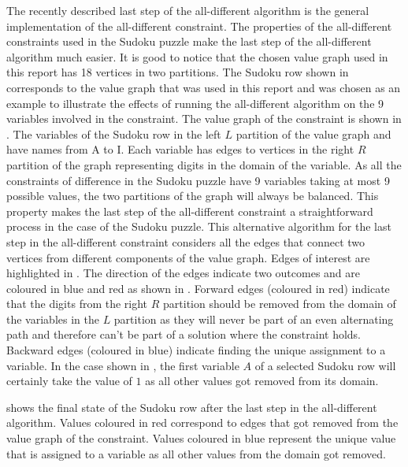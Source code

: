 \documentclass{l4proj}
\begin{document}
\noindent The recently described last step of the all-different algorithm is the general implementation of the all-different constraint. The properties of the all-different constraints used in the Sudoku puzzle make the last step of the all-different algorithm much easier. It is good to notice that the chosen value graph used in this report has 18 vertices in two partitions. The Sudoku row shown in  corresponds to the value graph that was used in this report and was chosen as an example to illustrate the effects of running the all-different algorithm on the 9 variables involved in the constraint. The value graph of the constraint is shown in . The variables of the Sudoku row in the left $L$ partition of the value graph and have names from A to I. Each variable has edges to vertices in the right $R$ partition of the graph representing digits in the domain of the variable. As all the constraints of difference in the Sudoku puzzle have 9 variables taking at most 9 possible values, the two partitions of the graph will always be balanced. This property makes the last step of the all-different constraint a straightforward process in the case of the Sudoku puzzle. This alternative algorithm for the last step in the all-different constraint considers all the edges that connect two vertices from different components of the value graph. Edges of interest are highlighted in . The direction of the edges indicate two outcomes and are coloured in blue and red as shown in . Forward edges (coloured in red) indicate that the digits from the right $R$ partition should be removed from the domain of the variables in the $L$ partition as they will never be part of an even alternating path and therefore can't be part of a solution where the constraint holds. Backward edges (coloured in blue) indicate finding the unique assignment to a variable. In the case shown in , the first variable $A$ of a selected Sudoku row will certainly take the value of $1$ as all other values got removed from its domain.

\noindent {} shows the final state of the Sudoku row after the last step in the all-different algorithm. Values coloured in red correspond to edges that got removed from the value graph of the constraint. Values coloured in blue represent the unique value that is assigned to a variable as all other values from the domain got removed.
\end{document}
